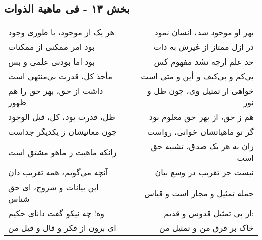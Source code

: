 \begin{center}
\section*{بخش ۱۳ - فی ماهیة الذوات}
\label{sec:013}
\begin{longtable}{l p{0.5cm} r}
هر یک از موجود، با طوری وجود
&&
بهر او موجود شد، انسان نمود
\\
بود امر ممکنی از ممکنات
&&
در ازل ممتاز از غیرش به ذات
\\
بود اما بودنی علمی و بس
&&
حد علم ارچه نشد مفهوم کس
\\
مأخذ کل، قدرت بی‌منتهی است
&&
بی‌کم و بی‌کیف و أین و متی است
\\
داشت از حق، بهر حق را هم ظهور
&&
خواهی ار تمثیل وی، چون ظل و نور
\\
ظل، قدرت بود، کل، قبل الوجود
&&
هم ز حق، از بهر حق معلوم بود
\\
چون معانیشان ز یکدیگر جداست
&&
گر تو ماهیاتشان خوانی، رواست
\\
زانکه ماهیت ز ماهو مشتق است
&&
زان به هر یک صدق، تشبیه حق است
\\
آنچه می‌گویم، همه تقریب دان
&&
نیست جز تقریب در وسع بیان
\\
این بیانات و شروح، ای حق شناس
&&
جمله تمثیل و مجاز است و قیاس
\\
وه! چه نیکو گفت دانای حکیم
&&
از پی تمثیل قدوس و قدیم:
\\
ای برون از فکر و قال و قیل من
&&
خاک بر فرق من و تمثیل من
\\
\end{longtable}
\end{center}
